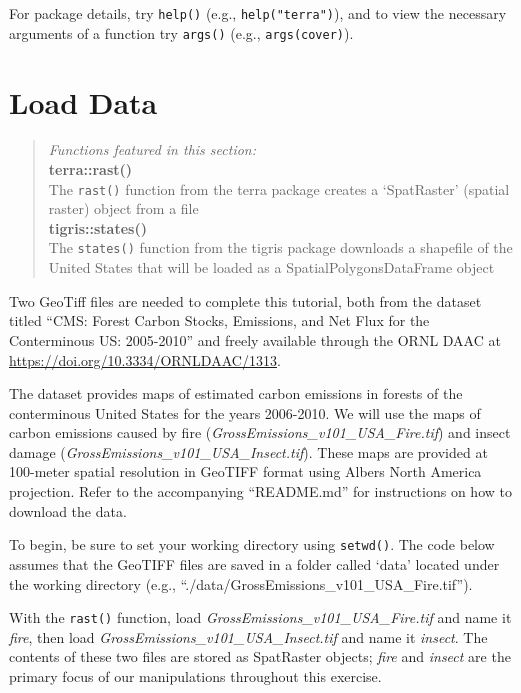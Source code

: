 \documentclass[
]{article}
\begin{document}
For package details, try \texttt{help()} (e.g., \texttt{help("terra")}),
and to view the necessary arguments of a function try \texttt{args()}
(e.g., \texttt{args(cover)}).

\hypertarget{load-data}{%
\section{Load Data}\label{load-data}}

\begin{quote}
\emph{Functions featured in this section:}\\
\textbf{terra::rast()}\\
The \texttt{rast()} function from the terra package creates a
`SpatRaster' (spatial raster) object from a file\\
\textbf{tigris::states()}\\
The \texttt{states()} function from the tigris package downloads a
shapefile of the United States that will be loaded as a
SpatialPolygonsDataFrame object
\end{quote}

Two GeoTiff files are needed to complete this tutorial, both from the
dataset titled ``CMS: Forest Carbon Stocks, Emissions, and Net Flux for
the Conterminous US: 2005-2010'' and freely available through the ORNL
DAAC at\\
\url{https://doi.org/10.3334/ORNLDAAC/1313}.

The dataset provides maps of estimated carbon emissions in forests of
the conterminous United States for the years 2006-2010. We will use the
maps of carbon emissions caused by fire
(\emph{GrossEmissions\_v101\_USA\_Fire.tif}) and insect damage
(\emph{GrossEmissions\_v101\_USA\_Insect.tif}). These maps are provided
at 100-meter spatial resolution in GeoTIFF format using Albers North
America projection. Refer to the accompanying ``README.md'' for
instructions on how to download the data.

To begin, be sure to set your working directory using \texttt{setwd()}.
The code below assumes that the GeoTIFF files are saved in a folder
called `data' located under the working directory (e.g.,
``./data/GrossEmissions\_v101\_USA\_Fire.tif'').

With the \texttt{rast()} function, load
\emph{GrossEmissions\_v101\_USA\_Fire.tif} and name it \emph{fire}, then
load \emph{GrossEmissions\_v101\_USA\_Insect.tif} and name it
\emph{insect}. The contents of these two files are stored as SpatRaster
objects; \emph{fire} and \emph{insect} are the primary focus of our
manipulations throughout this exercise.
\end{document}
